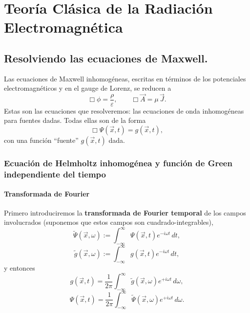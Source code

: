 \chapter{Teoría Clásica de la Radiación Electromagnética}\label{caprad}

\section{Resolviendo las ecuaciones de Maxwell.}\label{resolvmax}

Las ecuaciones de Maxwell inhomogéneas, escritas en términos de los potenciales electromagnéticos y en el gauge de Lorenz, se reducen a
\begin{equation}
 \Box\phi=\frac{\rho}{\varepsilon}, \qquad  \Box\vec{A}=\mu\,\vec{J}.
\end{equation}
Estas son las ecuaciones que resolveremos: las ecuaciones de onda
inhomogéneas para fuentes dadas. Todas ellas son de la forma
\begin{equation}
\Box \Psi(\vec{x},t)=g(\vec{x},t), \label{oih}
\end{equation}
con una función ``fuente'' $g(\vec{x},t)$ dada.


\subsection{Ecuación de Helmholtz inhomogénea y función de Green independiente del tiempo}
\subsubsection{Transformada de Fourier}
Primero introduciremos la \textbf{transformada de Fourier temporal} de los campos involucrados (suponemos que estos campos son cuadrado-integrables),
\begin{equation}
\tilde{\Psi}(\vec{x},\omega):=\int_{-\infty}^\infty
\Psi(\vec{x},t)e^{-i\omega t}\,dt,
\end{equation}
\begin{equation}
\tilde{g}(\vec{x},\omega):=\int_{-\infty}^\infty
g(\vec{x},t)e^{-i\omega t}\,dt ,
\end{equation}
y entonces
\begin{equation}
g(\vec{x},t)=\frac{1}{2\pi}\int_{-\infty}^\infty
\tilde{g}(\vec{x},\omega)e^{+i\omega t}\,d\omega,
\end{equation}
\begin{equation}
\Psi(\vec{x},t)=\frac{1}{2\pi}\int_{-\infty}^\infty
\tilde{\Psi}(\vec{x},\omega)e^{+i\omega t}\,d\omega.
\end{equation}

